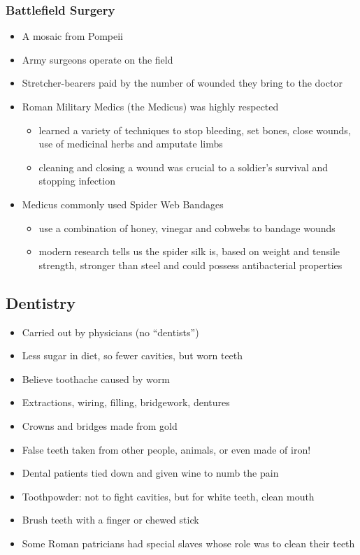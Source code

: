 \documentclass[12pt, twoside]{article}
\begin{document}
\subsubsection{Battlefield Surgery}
\begin{itemize}
\item A mosaic from Pompeii
\item Army surgeons operate on the field
\item Stretcher-bearers paid by the number of wounded they bring to the doctor
\item Roman Military Medics (the Medicus) was highly respected
	\begin{itemize}
	\item learned a variety of techniques to stop bleeding, set bones, close wounds, use of medicinal herbs and amputate limbs
	\item cleaning and closing a wound was crucial to a soldier’s survival and stopping infection
	\end{itemize}
\item Medicus commonly used Spider Web Bandages
	\begin{itemize}
	\item use a combination of honey, vinegar and cobwebs to bandage wounds
	\item modern research tells us the spider silk is, based on weight and tensile strength, stronger than steel and could possess antibacterial properties
	\end{itemize}
\end{itemize}	

\subsection{Dentistry}
\begin{itemize}
\item Carried out by physicians (no “dentists”)
\item Less sugar in diet, so fewer cavities, but worn teeth
\item Believe toothache caused by worm
\item Extractions, wiring, filling, bridgework, dentures
\item Crowns and bridges made from gold
\item False teeth taken from other people, animals, or even made of iron!
\item Dental patients tied down and given wine to numb the pain
\item Toothpowder: not to fight cavities, but for white teeth, clean mouth
\item Brush teeth with a finger or chewed stick
\item Some Roman patricians had special slaves whose role was to clean their teeth
\end{itemize}
\end{document}
